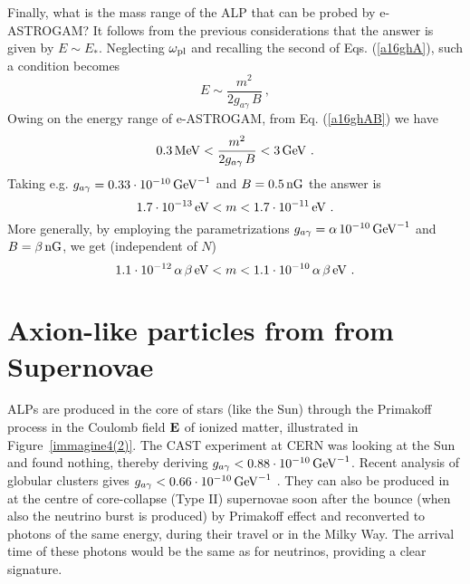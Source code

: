 \documentclass[aps,12pt,tightenlines,amsmath,amssymb]{revtex4}
\begin{document}
Finally, what is the mass range of the ALP that can be probed by e-ASTROGAM? It follows from the previous considerations that the answer is given by $E \sim E_*$. Neglecting ${\omega}_{\rm pl}$ and recalling the second of Eqs. (\ref{a16ghA}), such 
a condition becomes 
\begin{equation} 
E \sim \frac{m^2}{2 g_{a \gamma} \, B}~, 
\label{a16ghAB}
\end{equation}
Owing on the energy range of e-ASTROGAM, from Eq. (\ref{a16ghAB}) we have
\begin{equation} 
0.3 \, {\rm MeV} < \frac{m^2}{2 g_{a \gamma} \, B} < 3 \, {\rm GeV}~. 
\label{a16ghAC}
\end{equation}
Taking e.g. $g_{a \gamma} = 0.33 \cdot 10^{- 10} \, {\rm GeV}^{- 1}$ and $B = 0.5 \, {\rm nG}$ the answer is
\begin{equation} 
1.7 \cdot 10^{- 13} \, {\rm eV} < m <  1.7 \cdot 10^{- 11} \, {\rm eV}~. 
\label{a16ghAD}
\end{equation}
More generally, by employing the parametrizations $g_{a \gamma} = \alpha \, 10^{- 10} \, {\rm GeV}^{- 1}$ and $B = \beta \, 
{\rm nG}$, we get (independent of $N$)
\begin{equation} 
1.1 \cdot 10^{- 12} \, \alpha \, \beta \, {\rm eV} < m <  1.1 \cdot 10^{- 10} \, \alpha \, \beta \, {\rm eV}~. 
\label{a16ghAE}
\end{equation}

\section{Axion-like particles from  from Supernovae}

ALPs are produced in the core of  stars (like the Sun) through the Primakoff process in the Coulomb field ${\bf E}$ of ionized matter, illustrated in Figure~\ref{immagine4(2)}. The CAST experiment at CERN was looking at the Sun and found nothing, thereby deriving $g_{a \gamma} < 0.88 \cdot 10^{- 10} \, {\rm GeV}^{- 1}$. Recent analysis of globular clusters gives $g_{a \gamma} < 0.66 \cdot 10^{- 10} \, {\rm GeV}^{- 1}$ \cite{pdg2016}. 
They can also be produced in at the centre of core-collapse (Type II) supernovae soon after the bounce (when also the neutrino burst is produced) by Primakoff effect
and reconverted to photons of the same energy, during their travel or in the Milky Way. The arrival time of these photons would
be the same as for neutrinos, providing a clear signature.
\end{document}
